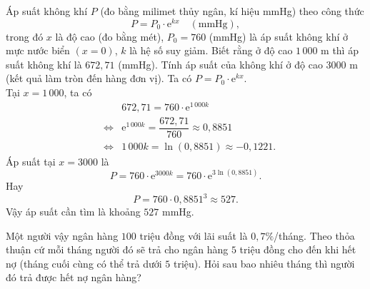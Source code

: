 \begin{bt}%
	Áp suất không khí $P$ (đo bằng milimet thủy ngân, kí hiệu mmHg) theo công thức
	\[
	P = P_0 \cdot \mathrm{e}^{kx} \quad (\text{mmHg}),
	\]
	trong đó $x$ là độ cao (đo bằng mét), $P_0=760$ (mmHg) là áp suất không khí ở mực nước biển $(x=0)$, $k$ là hệ số suy giảm. Biết rằng ở độ cao $1\,000$ m thì áp suất không khí là $672{,}71$ (mmHg). Tính áp suất của không khí ở độ cao $3000$ m (kết quả làm tròn đến hàng đơn vị).
	\loigiai
	{
		Ta có $P = P_0 \cdot \mathrm{e}^{kx}$.\\
		Tại $x=1\,000$, ta có 
		\begin{eqnarray*}
			&&672{,}71 = 760\cdot \mathrm{e}^{1\,000k}\\
			&\Leftrightarrow&\mathrm{e}^{1\,000k} = \dfrac{672{,}71}{760} \approx 0{,}8851\\
			&\Leftrightarrow&1\,000k = \ln(0{,}8851) \approx -0{,}1221.
		\end{eqnarray*}
		Áp suất tại $x=3000$ là
		\[
		P = 760\cdot \mathrm{e}^{3000k}=760\cdot \mathrm{e}^{3\ln (0{,}8851)}.
		\]
		Hay
		\[
		P= 760\cdot 0{,}8851^3\approx 527.
		\]
		Vậy áp suất cần tìm là khoảng $527$ mmHg.
	}
\end{bt}

\begin{bt}%
	Một người vậy ngân hàng $100$ triệu đồng với lãi suất là $0{,}7\%$/tháng. Theo thỏa thuận cứ mỗi tháng người đó sẽ trả cho ngân hàng $5$ triệu đồng cho đến khi hết nợ (tháng cuối cùng có thể trả dưới $5$ triệu). Hỏi sau bao nhiêu tháng thì người đó trả được hết nợ ngân hàng?
	\par{}
\end{bt}

